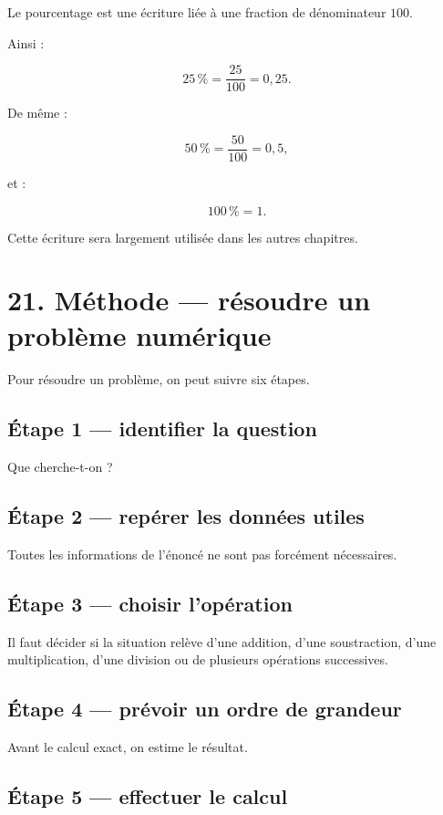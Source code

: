 Le pourcentage est une écriture liée à une fraction de dénominateur $100$.

Ainsi :

\[
25\,\%=\dfrac{25}{100}=0{,}25.
\]

De même :

\[
50\,\%=\dfrac{50}{100}=0{,}5,
\]

et :

\[
100\,\%=1.
\]

Cette écriture sera largement utilisée dans les autres chapitres.

\section{21. Méthode — résoudre un problème numérique}

Pour résoudre un problème, on peut suivre six étapes.

\subsection{Étape 1 — identifier la question}

Que cherche-t-on ?

\subsection{Étape 2 — repérer les données utiles}

Toutes les informations de l’énoncé ne sont pas forcément nécessaires.

\subsection{Étape 3 — choisir l’opération}

Il faut décider si la situation relève d’une addition, d’une soustraction, d’une multiplication, d’une division ou de plusieurs opérations successives.

\subsection{Étape 4 — prévoir un ordre de grandeur}

Avant le calcul exact, on estime le résultat.

\subsection{Étape 5 — effectuer le calcul}

